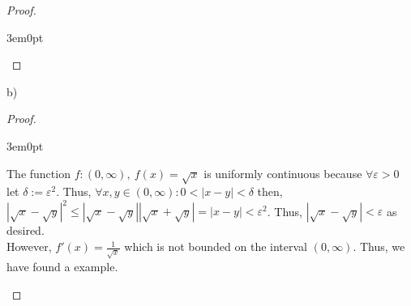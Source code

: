 \documentclass[11pt]{article}
\newenvironment{myproof}
{\begin{proof} \begin{adjustwidth}{3em}{0pt}$ $\par\nobreak\ignorespaces}
{\end{adjustwidth} \end{proof}}
\begin{document}
\begin{flushleft}
\begin{myproof}
\end{myproof}

b)

\begin{myproof}

The function $f:(0, \infty), \ f(x) = \sqrt{x}$ is uniformly continuous because $\forall \varepsilon >0 $ let $\delta := \varepsilon^2$. Thus, $\forall x,y \in (0,\infty): 0<|x-y|<\delta$ then, $|\sqrt{x} -\sqrt{y}|^2 \leq |\sqrt{x} -\sqrt{y}||\sqrt{x} +\sqrt{y}| = |x-y| < \varepsilon^2$. Thus, $|\sqrt{x} -\sqrt{y}| < \varepsilon$ as desired. \\
\bigskip
However, $f'(x) = \frac{1}{\sqrt{x}}$ which is not bounded on the interval $(0,\infty)$. Thus, we have found a example.

\end{myproof}

\end{flushleft}
\end{document}
